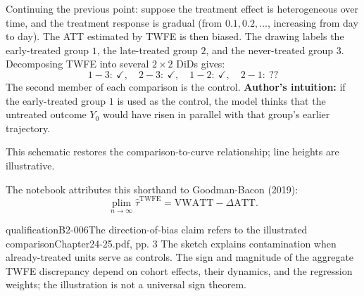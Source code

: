 Continuing the previous point: suppose the treatment effect is heterogeneous over time, and the treatment response is gradual (from \(0.1,0.2,\ldots\), increasing from day to day). The ATT estimated by TWFE is then biased.
The drawing labels the early-treated group \(1\), the late-treated group \(2\), and the never-treated group \(3\). Decomposing TWFE into several \(2\times2\) DiDs gives:
\[
1-3:\ \checkmark,\quad
2-3:\ \checkmark,\quad
1-2:\ \checkmark,\quad
2-1:\ \text{??}
\]
The second member of each comparison is the control. \textbf{Author's intuition:} if the early-treated group \(1\) is used as the control, the model thinks that the untreated outcome \(Y_0\) would have risen in parallel with that group's earlier trajectory. 
\begin{center}
\end{center}
This schematic restores the comparison-to-curve relationship; line heights are illustrative.

The notebook attributes this shorthand to Goodman-Bacon (2019):
\[
\operatorname*{plim}_{n\to\infty}\widehat\tau^{\mathrm{TWFE}}
 =\mathrm{VWATT}-\Delta\mathrm{ATT}.
\]
\begin{reviewnote}{qualification}{B2-006}{The direction-of-bias claim refers to the illustrated comparison}{Chapter24-25.pdf, pp. 3}
The sketch explains contamination when already-treated units serve as controls. The sign and magnitude of the aggregate TWFE discrepancy depend on cohort effects, their dynamics, and the regression weights; the illustration is not a universal sign theorem.
\par{}
\end{reviewnote}


